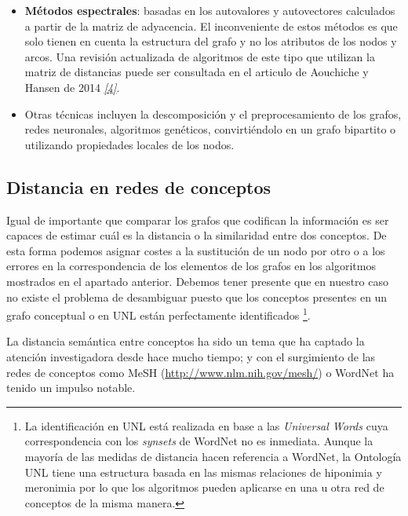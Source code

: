 \documentclass[a4paper,12pt,spanish]{book}
\begin{document}
\begin{itemize}
\item {} 
\textbf{Métodos espectrales}: basadas en los autovalores y autovectores calculados a partir de la
matriz de adyacencia. El inconveniente de estos métodos es que solo tienen en cuenta la
estructura del grafo y no los atributos de los nodos y arcos. Una revisión actualizada de
algoritmos de este tipo que utilizan la matriz de distancias puede ser consultada en
el articulo de Aouchiche y Hansen de 2014 \label{1.state-of-the-art/ii.medidas-distancia:id26}{\hyperref[zreferences:aouchiche2014]{\emph{{[}4{]}}}}.

\item {} 
Otras técnicas incluyen la descomposición y el preprocesamiento de los grafos, redes
neuronales, algoritmos genéticos, convirtiéndolo en un grafo bipartito o utilizando
propiedades locales de los nodos.

\end{itemize}


\subsection{Distancia en redes de conceptos}
\label{1.state-of-the-art/ii.medidas-distancia:distancia-en-redes-de-conceptos}
Igual de importante que comparar los grafos que codifican la información es ser capaces de
estimar cuál es la distancia o la similaridad entre dos conceptos. De esta forma podemos asignar
costes a la sustitución de un nodo por otro o a los errores en la correspondencia de los
elementos de los grafos en los algoritmos mostrados en el apartado anterior. Debemos tener presente
que en nuestro caso no existe el problema de desambiguar puesto que los conceptos presentes en
un grafo conceptual o en UNL están perfectamente identificados \footnote{
La identificación en UNL está realizada en base a las \emph{Universal Words} cuya correspondencia
con los \emph{synsets} de WordNet no es inmediata. Aunque la mayoría de las medidas de distancia
hacen referencia a WordNet, la Ontología UNL tiene una estructura basada en las mismas
relaciones de hiponimia y meronimia por lo que los algoritmos pueden aplicarse en una u otra
red de conceptos de la misma manera.
}.

La distancia semántica entre conceptos ha sido un tema que ha captado la atención investigadora
desde hace mucho tiempo; y con el surgimiento de las redes de conceptos como MeSH
(\href{http://www.nlm.nih.gov/mesh/}{http://www.nlm.nih.gov/mesh/}) o WordNet ha tenido un impulso notable.
\end{document}
